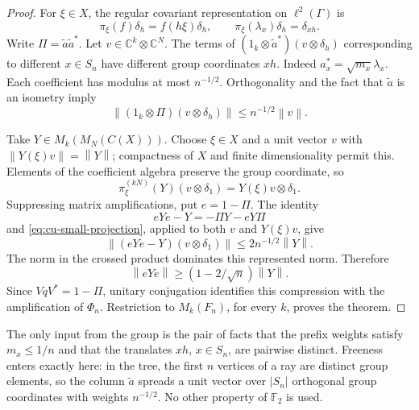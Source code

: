 \begin{proof}
For $\xi\in X$, the regular covariant representation on $\ell^2(\Gamma)$ is 
\begin{equation*}
\pi_\xi(f)\delta_h=f(h\xi)\delta_h,\qquad
\pi_\xi(\lambda_x)\delta_h=\delta_{xh}.
\end{equation*}
Write $\Pi=\widetilde a\widetilde a^*$. Let $v\in\mathbb{C}^k\otimes\mathbb{C}^N$. The terms of $(1_k\otimes\widetilde a^*)(v\otimes\delta_h)$
corresponding to different $x\in S_n$ have different group coordinates $xh$.
Indeed $a_x^*=\sqrt{m_x}\lambda_x$. Each coefficient has modulus at most $n^{-1/2}$. Orthogonality and the fact that $\widetilde a$ is an isometry
imply 
\begin{equation}  \label{eq:cu-small-projection}
\left\|(1_k\otimes\Pi)(v\otimes\delta_h)\right\| \leq
n^{-1/2}\left\|v\right\|.
\end{equation}

Take $Y\in M_k(M_N(C(X)))$. Choose $\xi\in X$ and a unit vector $v$ with $\left\|Y(\xi)v\right\|=\left\|Y\right\|$; compactness of $X$ and finite
dimensionality permit this. Elements of the coefficient algebra preserve the
group coordinate, so 
\begin{equation*}
\pi_\xi^{(kN)}(Y)(v\otimes\delta_1)=Y(\xi)v\otimes\delta_1.
\end{equation*}
Suppressing matrix amplifications, put $e=1-\Pi$. The identity 
\begin{equation*}
eYe-Y=-\Pi Y-eY\Pi
\end{equation*}
and \eqref{eq:cu-small-projection}, applied to both $v$ and $Y(\xi)v$, give 
\begin{equation*}
\left\|(eYe-Y)(v\otimes\delta_1)\right\| \leq 2n^{-1/2}\left\|Y\right\|.
\end{equation*}
The norm in the crossed product dominates this represented norm. Therefore 
\begin{equation*}
\left\|eYe\right\|\geq(1-2/\sqrt n)\left\|Y\right\|.
\end{equation*}
Since $VqV^*=1-\Pi$, unitary conjugation identifies this compression with
the amplification of $\Phi_n$. Restriction to $M_k(F_n)$, for every $k$,
proves the theorem.
\end{proof}

The only input from the group is the pair of facts that the prefix weights
satisfy $m_x\leq1/n$ and that the translates $xh$, $x\in S_n$, are pairwise
distinct. Freeness enters exactly here: in the tree, the first $n$ vertices
of a ray are distinct group elements, so the column $\widetilde a$ spreads a
unit vector over $\left|S_n\right|$ orthogonal group coordinates with
weights $n^{-1/2}$. No other property of $\mathbb{F}_2$ is used.

